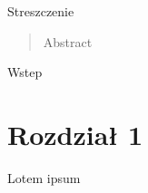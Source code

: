 \documentclass[oik, pdftex, robocza, man]{mgrwms}
\begin{document}
% 
\tableofcontents
\begin{streszczenie}
Streszczenie
 

\end{streszczenie}
\begin{abstract}
Abstract

\end{abstract}
\begin{wstep}    %
Wstep

% 
\end{wstep}

\chapter{Rozdział 1}

Lotem ipsum

\mgrclosechapter

%  
\begin{thebibliography}{88}
\end{thebibliography}
\end{document}
